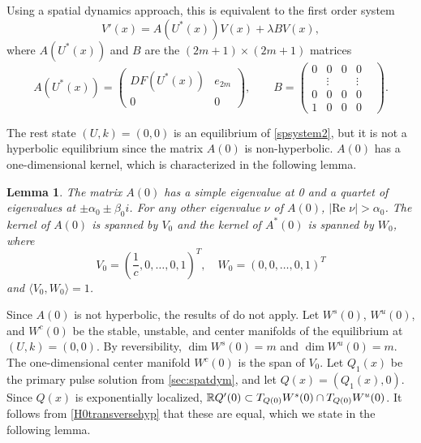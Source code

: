 \documentclass[11pt,reqno]{amsart}
\theoremstyle{plain}
\newtheorem{lemma}[theorem]{Lemma}
\theoremstyle{definition}
\theoremstyle{remark}
\begin{document}
Using a spatial dynamics approach, this is equivalent to the first order system 
\begin{equation}\label{PDEeigsystem}
V'(x) = A(U^*(x))V(x) + \lambda B V(x),
\end{equation}
where $A(U^*(x))$ and $B$ are the $(2m+1) \times (2m+1)$ matrices
\begin{equation}\label{defAB}
A(U^*(x)) = 
\begin{pmatrix}
DF(U^*(x)) & e_{2m}\\
0 & 0
\end{pmatrix}, \qquad
B = \begin{pmatrix}0 & 0 & 0 & 0 \\ & 
\vdots & & \vdots & \\0 & 0 & 0 & 0 \\1 & 0 & 0 & 0 \end{pmatrix}.
\end{equation}

The rest state $(U, k) = (0, 0)$ is an equilibrium of \cref{spsystem2}, but it is not a hyperbolic equilibrium since the matrix $A(0)$ is non-hyperbolic. $A(0)$ has a one-dimensional kernel, which is characterized in the following lemma. 

\begin{lemma}\label{eigA0lemma}
The matrix $A(0)$ has a simple eigenvalue at 0 and a quartet of eigenvalues at $\pm \alpha_0 \pm \beta_0 i$. For any other eigenvalue $\nu$ of $A(0)$, $|\text{Re }\nu| > \alpha_0$. The kernel of $A(0)$ is spanned by $V_0$ and the kernel of $A^*(0)$ is spanned by $W_0$, where
\begin{equation}\label{V0W0}
V_0 = \left(\frac{1}{c}, 0, \dots, 0, 1\right)^T, \quad
W_0 = (0, 0, \dots, 0, 1)^T
\end{equation}
and $\langle V_0, W_0 \rangle = 1$.
\end{lemma}

Since $A(0)$ is not hyperbolic, the results of \cite{Sandstede1998} do not apply. Let $W^s(0)$, $W^u(0)$, and $W^c(0)$ be the stable, unstable, and center manifolds of the equilibrium at $(U, k) = (0, 0)$. By reversibility, $\dim W^s(0) = m$ and $\dim W^u(0) = m$. The one-dimensional center manifold $W^c(0)$ is the span of $V_0$. Let $Q_1(x)$ be the primary pulse solution from \cref{sec:spatdym}, and let $Q(x) = (Q_1(x), 0)$. Since $Q(x)$ is exponentially localized, $\mathbb{R} Q'(0) \subset T_{Q(0)}W^s(0) \cap T_{Q(0)}W^u(0)$. It follows from \cref{H0transversehyp} that these are equal, which we state in the following lemma.
\end{document}
